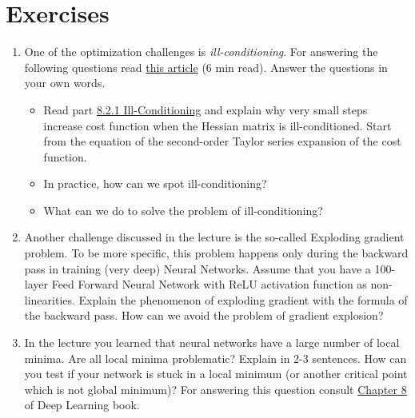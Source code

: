 \section*{Exercises}
\begin{exercise}

\begin{enumerate}

	\item One of the optimization challenges is \textit{ill-conditioning}. For answering the following questions read \href{https://medium.com/@shaikhz94/understanding-ill-conditioning-in-deep-neural-networks-2396d6fb0098}{this article} (6 min read). Answer the questions in your own words.
		\begin{itemize}
			\item Read part \href{https://www.deeplearningbook.org/contents/optimization.html}{8.2.1 Ill-Conditioning} and explain why very small steps increase cost function when the Hessian matrix is ill-conditioned. Start from the equation of the second-order Taylor series expansion of the cost function.
			\item In practice, how can we spot ill-conditioning?
			\item What can we do to solve the problem of ill-conditioning?
		\end{itemize}
		
	\item Another challenge discussed in the lecture is the so-called Exploding gradient problem. To be more specific, this problem happens only during the backward pass in training (very deep) Neural Networks. 
	Assume that you have a 100-layer Feed Forward Neural Network with ReLU activation function as non-linearities. Explain the phenomenon of exploding gradient with the formula of the backward pass.
How can we avoid the problem of gradient explosion?
		
	\item In the lecture you learned that neural networks have a large number of local minima. Are all local minima problematic? Explain in 2-3 sentences. How can you test if your network is stuck in a local minimum (or another critical point which is not global minimum)? For answering this question consult \href{https://www.deeplearningbook.org/contents/optimization.html}{Chapter 8} of Deep Learning book.

\end{enumerate}

\end{exercise}

